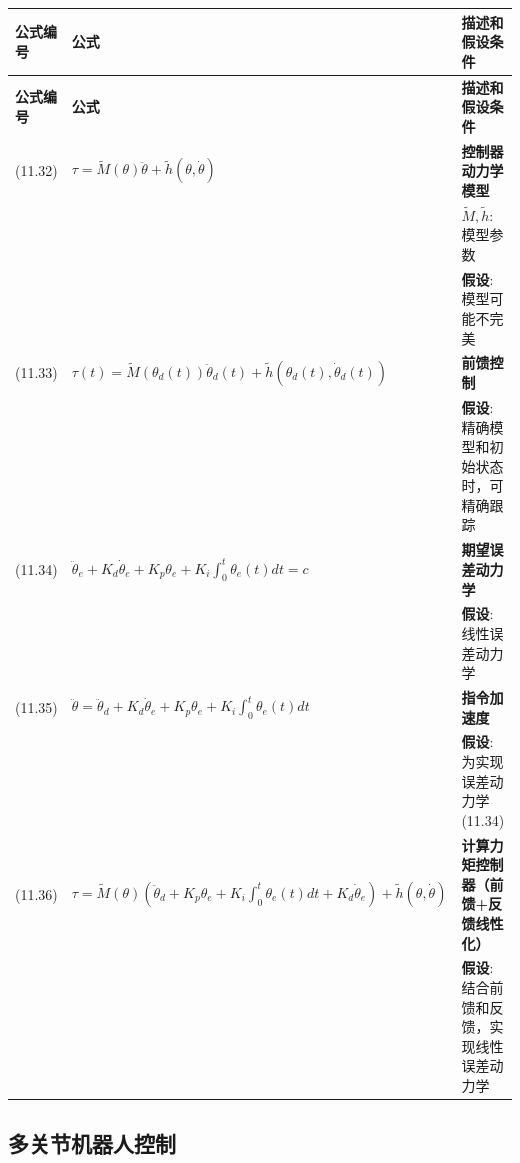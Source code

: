 \documentclass[12pt,a4paper]{article}
\begin{document}
\begin{longtable}{|p{}|p{}|p{}|}
\hline
\textbf{公式编号} & \textbf{公式} & \textbf{描述和假设条件} \\
\hline
\endfirsthead
\hline
\textbf{公式编号} & \textbf{公式} & \textbf{描述和假设条件} \\
\hline
\endhead
\hline
\endfoot
\hline
\endlastfoot

(11.32) & $\tau = \tilde{M}(\theta)\ddot{\theta} + \tilde{h}(\theta, \dot{\theta})$ & 
\textbf{控制器动力学模型} \\
& & $\tilde{M}, \tilde{h}$: 模型参数 \\
& & \textbf{假设}: 模型可能不完美 \\
\hline

(11.33) & $\tau(t) = \tilde{M}(\theta_d(t))\ddot{\theta}_d(t) + \tilde{h}(\theta_d(t), \dot{\theta}_d(t))$ & 
\textbf{前馈控制} \\
& & \textbf{假设}: 精确模型和初始状态时，可精确跟踪 \\
\hline

(11.34) & $\ddot{\theta}_e + K_d\dot{\theta}_e + K_p\theta_e + K_i\int_0^t\theta_e(t)dt = c$ & 
\textbf{期望误差动力学} \\
& & \textbf{假设}: 线性误差动力学 \\
\hline

(11.35) & $\ddot{\theta} = \ddot{\theta}_d + K_d\dot{\theta}_e + K_p\theta_e + K_i\int_0^t\theta_e(t)dt$ & 
\textbf{指令加速度} \\
& & \textbf{假设}: 为实现误差动力学(11.34) \\
\hline

(11.36) & $\tau = \tilde{M}(\theta)\left(\ddot{\theta}_d + K_p\theta_e + K_i\int_0^t\theta_e(t)dt + K_d\dot{\theta}_e\right) + \tilde{h}(\theta, \dot{\theta})$ & 
\textbf{计算力矩控制器（前馈+反馈线性化）} \\
& & \textbf{假设}: 结合前馈和反馈，实现线性误差动力学 \\
\hline

\end{longtable}

\subsection{多关节机器人控制}
\end{document}

